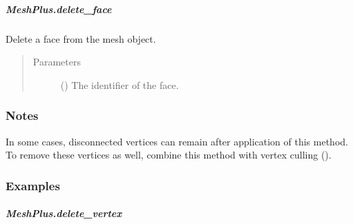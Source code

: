 \documentclass[letterpaper,10pt,english]{sphinxmanual}
\begin{document}
\begin{fulllineitems}
\begin{fulllineitems}
\end{fulllineitems}



\subparagraph{MeshPlus.delete\_face}
\label{\detokenize{api/generated/directional_clustering.mesh.MeshPlus.delete_face:meshplus-delete-face}}\label{\detokenize{api/generated/directional_clustering.mesh.MeshPlus.delete_face::doc}}

\begin{fulllineitems}
\label{\detokenize{api/generated/directional_clustering.mesh.MeshPlus.delete_face:directional_clustering.mesh.MeshPlus.delete_face}}
Delete a face from the mesh object.
\begin{quote}\begin{description}
\item[{Parameters}] \leavevmode
{} () \textendash{} The identifier of the face.

\end{description}\end{quote}
\subsubsection*{Notes}

In some cases, disconnected vertices can remain after application of this
method. To remove these vertices as well, combine this method with vertex
culling ({\hyperref[\detokenize{api/generated/directional_clustering.mesh.MeshPlus.cull_vertices:directional_clustering.mesh.MeshPlus.cull_vertices}]{}}).
\subsubsection*{Examples}

\begin{sphinxVerbatim}[commandchars=\\\{\}]
\end{sphinxVerbatim}

\end{fulllineitems}



\subparagraph{MeshPlus.delete\_vertex}
\label{\detokenize{api/generated/directional_clustering.mesh.MeshPlus.delete_vertex:meshplus-delete-vertex}}\label{\detokenize{api/generated/directional_clustering.mesh.MeshPlus.delete_vertex::doc}}


\end{fulllineitems}
\end{document}
